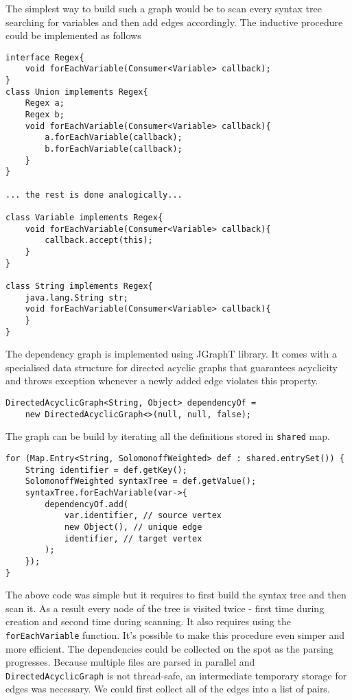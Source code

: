 The simplest way to build such a graph would be to scan every syntax tree searching for variables and then add edges accordingly. The inductive procedure could be implemented as follows
\begin{lstlisting}
interface Regex{
    void forEachVariable(Consumer<Variable> callback);
}
class Union implements Regex{
    Regex a; 
    Regex b;
    void forEachVariable(Consumer<Variable> callback){
        a.forEachVariable(callback);
        b.forEachVariable(callback);
    }
}

... the rest is done analogically...

class Variable implements Regex{
    void forEachVariable(Consumer<Variable> callback){
    	callback.accept(this);
    }
}

class String implements Regex{
    java.lang.String str;
    void forEachVariable(Consumer<Variable> callback){
    }
}
\end{lstlisting}
The dependency graph is implemented using JGraphT library. It comes with a specialised data structure for directed acyclic graphs that guarantees acyclicity and throws exception whenever a newly added edge violates this property.
\begin{lstlisting}
DirectedAcyclicGraph<String, Object> dependencyOf =
    new DirectedAcyclicGraph<>(null, null, false);
\end{lstlisting}
The graph can be build by iterating all the definitions stored in \texttt{shared} map.
\begin{lstlisting}
for (Map.Entry<String, SolomonoffWeighted> def : shared.entrySet()) {
    String identifier = def.getKey();
    SolomonoffWeighted syntaxTree = def.getValue();
    syntaxTree.forEachVariable(var->{
        dependencyOf.add(
            var.identifier, // source vertex
            new Object(), // unique edge
            identifier, // target vertex
        );
    });
}
\end{lstlisting}
The above code was simple but it requires to first build the syntax tree and then scan it. As a result every node of the tree is visited twice - first time during creation and second time during scanning. It also requires using the 
\texttt{forEachVariable} function. It's possible to make this procedure even simper and more efficient. The dependencies could be collected on the spot as the parsing progresses. Because multiple files are parsed in parallel
and \texttt{DirectedAcyclicGraph} is not thread-safe, an intermediate temporary storage for edges was necessary. We could first collect all of the edges into a list of pairs.
